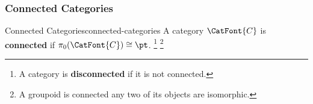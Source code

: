 \subsubsection{Connected Categories}\label{subsubsection-the-quadruple-adjunction-with-sets-connected-categories}
\begin{definition}{Connected Categories}{connected-categories}%
    A category $\CatFont{C}$ is \textbf{connected} if $\pi_{0}(\CatFont{C})\cong\pt$.%
    \footnote{%
        A category is \textbf{disconnected} if it is not connected.
    }%
    \footnote{%
        A groupoid is connected \textiff any two of its objects are isomorphic.
        \par\vspace*{\TCBBoxCorrection}
    }%
\end{definition}
